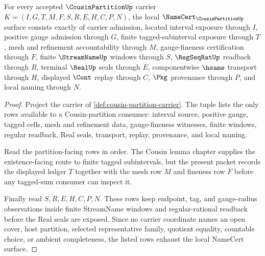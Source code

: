 \begin{theorem}
\label{thm:cousin-partition-namecert-obligations}
For every accepted $\CousinPartitionUp$ carrier $K=(I,G,T,M,F,S,R,E,H,C,P,N)$, the local $\NameCert_{\CousinPartitionUp}$ surface consists exactly of carrier admission, located interval exposure through $I$, positive gauge admission through $G$, finite tagged-subinterval exposure through $T$, mesh and refinement accountability through $M$, gauge-fineness certification through $F$, finite $\StreamNameUp$ windows through $S$, $\RegSeqRatUp$ readback through $R$, terminal $\RealUp$ seals through $E$, componentwise $\hsame$ transport through $H$, displayed $\Cont$ replay through $C$, $\Pkg$ provenance through $P$, and local naming through $N$.
\end{theorem}
\begin{proof}
Project the carrier of \autoref{def:cousin-partition-carrier}. The tuple lists the only rows available to a Cousin-partition consumer: interval source, positive gauge, tagged cells, mesh and refinement data, gauge-fineness witnesses, finite windows, regular readback, Real seals, transport, replay, provenance, and local naming.

Read the partition-facing rows in order. The Cousin lemma chapter supplies the existence-facing route to finite tagged subintervals, but the present packet records the displayed ledger $T$ together with the mesh row $M$ and fineness row $F$ before any tagged-sum consumer can inspect it.

Finally read $S,R,E,H,C,P,N$. These rows keep endpoint, tag, and gauge-radius observations inside finite StreamName windows and regular-rational readback before the Real seals are exposed. Since no carrier coordinate names an open cover, host partition, selected representative family, quotient equality, countable choice, or ambient completeness, the listed rows exhaust the local NameCert surface.
\end{proof}

